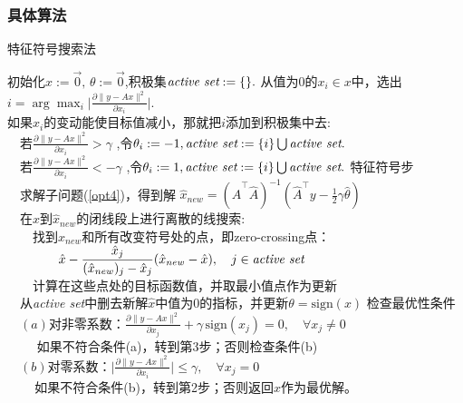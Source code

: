 \subsubsection{具体算法}
\begin{algorithm}[h]
\caption{特征符号搜索法}
\label{FSS_algorithm}
\begin{algorithmic}[1]
\STATE 初始化$x:=\vec{0},\,\theta:=\vec{0}$,积极集$\emph{active set}:=\{\}.$
\STATE 从值为0的$x_i\in x$中，选出$i=\arg \max_i \Big|\frac{\partial \|y-Ax\|^2}{\partial x_i}\Big|$.\\
 如果$x_i$的变动能使目标值减小，那就把$i$添加到积极集中去:\\
 $\quad$若$\frac{\partial \|y-Ax\|^2}{\partial x_i}>\gamma$
,令$\theta_i:=-1,\emph{active set}:=\{i\}\bigcup\emph{active set}.$\\
$\quad$若$ \frac{\partial \|y-Ax\|^2}{\partial x_i}<-\gamma$
,令$\theta_i:=1,\emph{active set}:=\{i\}\bigcup\emph{active set}.$
\STATE 特征符号步\\
$\quad$求解子问题(\ref{opt4})，得到解
$\hat{x}_{new}=(\hat{A}^{\top}\hat{A})^{-1}
(\hat{A}^{\top}y-\frac{1}{2}\gamma\hat{\theta})$\\
$\quad$在$\hat{x}$到$\hat{x}_{new}$的闭线段上进行离散的线搜索:\\
$\qquad$找到$\hat{x}_{new}$和所有改变符号处的点，即zero-crossing点：\\$\qquad \qquad \hat{x}-\dfrac{\hat{x} _j}{(\hat{x}_{new})_j-\hat{x}_j}(\hat{x}_{new}-\hat{x}),\quad j\in \emph{active set}$\\
$\qquad$计算在这些点处的目标函数值，并取最小值点作为更新\\
$\quad$从\emph{active set}中删去新解$\hat{x}$中值为0的指标，并更新$\theta=\text{sign}(x)$
\STATE 检查最优性条件 \\
$\quad(a)$对非零系数：$\frac{\partial \|y-Ax\|^2}{\partial x_j}+\gamma\,\text{sign}(x_j)=0,\quad \forall x_j\neq0$\\
$\qquad\,\,$如果不符合条件(a)，转到第3步；否则检查条件(b)\\
$\quad(b)$对零系数：$\Big|\frac{\partial \|y-Ax\|^2}{\partial x_i}\Big|\leq \gamma,\quad \forall x_j=0$\\
$\qquad\,$如果不符合条件(b)，转到第2步；否则返回$x$作为最优解。
\end{algorithmic}
\end{algorithm}

